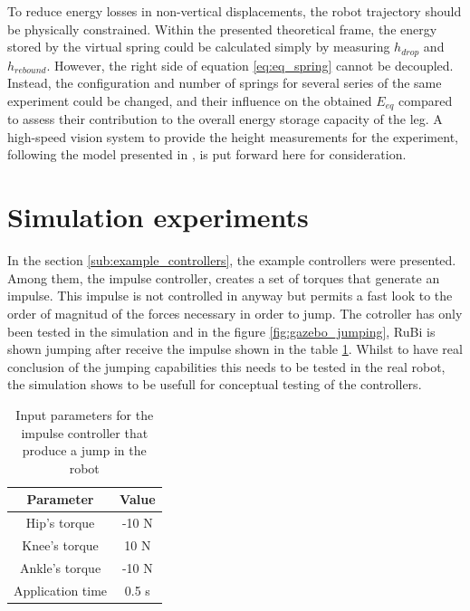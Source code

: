 To reduce energy losses in non-vertical displacements, the robot trajectory should be physically constrained.
Within the presented theoretical frame, the energy stored by the virtual spring could be calculated simply by measuring $h_{drop}$ and $h_{rebound}$.
However, the right side of equation \ref{eq:eq_spring} cannot be decoupled.
Instead, the configuration and number of springs for several series of the same experiment could be changed, and their influence on the obtained $E_{eq}$ compared to assess their contribution to the overall energy storage capacity of the leg.
A high-speed vision system to provide the height measurements for the experiment, following the model presented in \cite{hs_vision}, is put forward here for consideration. 


\section{Simulation experiments} %
\label{sec:simulation_experiments}
In the section \ref{sub:example_controllers}, the example controllers were presented.
Among them, the impulse controller, creates a set of torques that generate an impulse.
This impulse is not controlled in anyway but permits a fast look to the order of magnitud of the forces necessary in order to jump.
The cotroller has only been tested in the simulation and in the figure \ref{fig:gazebo_jumping}, RuBi is shown jumping after receive the impulse shown in the table \ref{tab:impulse_controller_inputs}. 
Whilst to have real conclusion of the jumping capabilities this needs to be tested in the real robot, the simulation shows to be usefull for conceptual testing of the controllers.

\begin{table}[tb]
    \caption{Input parameters for the impulse controller that produce a jump in the robot}
    \label{tab:impulse_controller_inputs}
    \centering

    \begin{tabular}{c|c}
    \textbf{Parameter} & \textbf{Value} \\
    \hline
        Hip's torque & -10 N \\
    \hline
        Knee's torque & 10 N \\
    \hline
        Ankle's torque & -10 N \\
    \hline
        Application time & 0.5 s \\
    \end{tabular}
\end{table}

